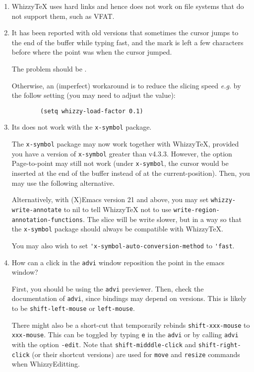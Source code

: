 \documentclass{article}
\def \WhizzyTeX{Whizzy\TeX}
\let \lst \verb
\begin{document}
\begin {enumerate}

\item
{\WhizzyTeX} uses hard links and hence does not work on file systems that do
not support them, such as VFAT.

\item
It has been reported with old versions that sometimes the cursor jumps to the
end of the buffer while typing fast, and the mark is left a few characters
before where the point was when the cursor jumped.

The problem should be \FIXED. 

Otherwise, an (imperfect) workaround is to reduce the slicing speed
\emph{e.g.}  by the follow setting (you may need to adjust the value):
\begin{verbatim}
        (setq whizzy-load-factor 0.1)
\end{verbatim}


\item Its does not work with the  \lst"x-symbol" package.

The \lst"x-symbol" package may now work together with {\WhizzyTeX}, provided
you have a version of {\tt x-symbol} greater than v4.3.3.  However, the
option Page-to-point may still not work (under \lst"x-symbol", the cursor
would be inserted at the end of the buffer instead of at the
current-position).  Then, you may use the following alternative.

Alternatively, with (X)Emacs version 21 and above, you may set
\lst"whizzy-write-annotate" to nil to tell {\WhizzyTeX} not to use
\lst"write-region-annotation-functions". The slice will be write slower, but
in a way so that the \lst"x-symbol" package should always be compatible with 
{\WhizzyTeX}. 

You may also wish to set \lst"'x-symbol-auto-conversion-method" to
\lst"'fast".

\item How can a click in the \lst"advi" window reposition the point
in the emacs window?

First, you should be using the \lst"advi" previewer.  Then, check the
documentation of \lst"advi", since bindings may depend on versions. This is
likely to be \lst"shift-left-mouse" or \lst"left-mouse".

There might also be a short-cut that temporarily rebinds
\lst"shift-xxx-mouse" to \lst"xxx-mouse". This can be toggled by typing
\lst"e"   in the \lst"advi" or by calling \lst"advi" with the option
\lst"-edit". 
%
Note that \lst"shift-midddle-click" and \lst"shift-right-click" (or their
shortcut versions) are used for \lst"move" and \lst"resize" commands when
WhizzyEditting.


\end {enumerate}
\end{document}
